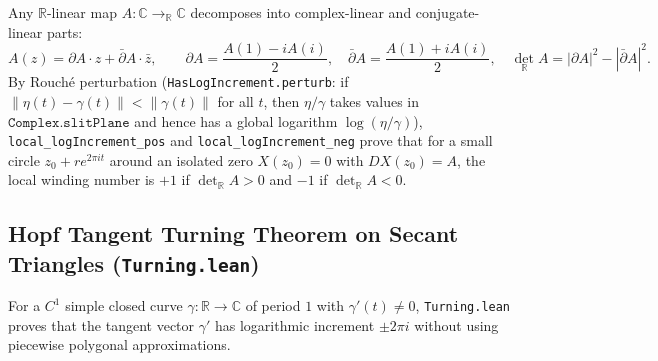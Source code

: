 \documentclass[11pt,reqno]{amsart}
\theoremstyle{definition}
\newcommand{\C}{\mathbb{C}}
\newcommand{\R}{\mathbb{R}}
\newcommand{\detR}{\det_{\R}}
\begin{document}
Any $\R$-linear map $A : \C \to_{\R} \C$ decomposes into complex-linear and conjugate-linear parts:
\[
A(z) = \partial A \cdot z + \bar{\partial} A \cdot \bar{z}, \qquad
\partial A = \frac{A(1) - i A(i)}{2}, \quad \bar{\partial} A = \frac{A(1) + i A(i)}{2}, \quad
\detR A = |\partial A|^2 - |\bar{\partial} A|^2.
\]
By Rouch\'e perturbation (\texttt{HasLogIncrement.perturb}: if $\|\eta(t)-\gamma(t)\| < \|\gamma(t)\|$ for all $t$, then $\eta/\gamma$ takes values in $\texttt{Complex.slitPlane}$ and hence has a global logarithm $\log(\eta/\gamma)$), \texttt{local\_logIncrement\_pos} and \texttt{local\_logIncrement\_neg} prove that for a small circle $z_0 + r e^{2\pi i t}$ around an isolated zero $X(z_0)=0$ with $DX(z_0) = A$, the local winding number is $+1$ if $\detR A > 0$ and $-1$ if $\detR A < 0$.

\subsection{Hopf Tangent Turning Theorem on Secant Triangles (\texttt{Turning.lean})}

For a $C^1$ simple closed curve $\gamma : \R \to \C$ of period $1$ with $\gamma'(t) \ne 0$, \texttt{Turning.lean} proves that the tangent vector $\gamma'$ has logarithmic increment $\pm 2\pi i$ without using piecewise polygonal approximations.
\end{document}
